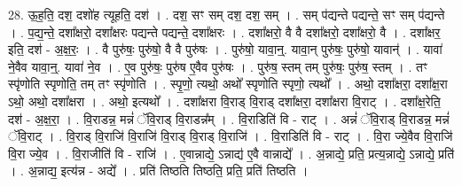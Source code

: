 \documentclass[17pt]{extarticle}
\begin{document}
28. ऊ॒ह॒ति॒ दश॒ दशो॑ह त्यूहति॒ दश॑ । . दश॒ सꣳ सम् दश॒ दश॒ सम् । . सम् प॑द्यन्ते पद्यन्ते॒ सꣳ सम् प॑द्यन्ते । . प॒द्य॒न्ते॒ दशा᳚क्षरो॒ दशा᳚क्षरः पद्यन्ते पद्यन्ते॒ दशा᳚क्षरः । . दशा᳚क्षरो॒ वै वै दशा᳚क्षरो॒ दशा᳚क्षरो॒ वै । . दशा᳚क्षर॒ इति॒ दश॑ - अ॒क्ष॒रः॒ । . वै पुरु॑षः॒ पुरु॑षो॒ वै वै पुरु॑षः । . पुरु॑षो॒ यावा॒न्॒. यावा॒न् पुरु॑षः॒ पुरु॑षो॒ यावान्॑ । . यावा॑ ने॒वैव यावा॒न्॒. यावा॑ ने॒व । . ए॒व पुरु॑षः॒ पुरु॑ष ए॒वैव पुरु॑षः । . पुरु॑ष॒ स्तम् तम् पुरु॑षः॒ पुरु॑ष॒ स्तम् । . तꣳ स्पृ॑णोति स्पृणोति॒ तम् तꣳ स्पृ॑णोति । . स्पृ॒णो॒ त्यथो॒ अथो᳚ स्पृणोति स्पृणो॒ त्यथो᳚ । . अथो॒ दशा᳚क्षरा॒ दशा᳚क्ष॒रा ऽथो॒ अथो॒ दशा᳚क्षरा । . अथो॒ इत्यथो᳚ । . दशा᳚क्षरा वि॒राड् वि॒राड् दशा᳚क्षरा॒ दशा᳚क्षरा वि॒राट् । . दशा᳚क्ष॒रेति॒ दश॑ - अ॒क्ष॒रा॒ । . वि॒राडन्न॒ मन्नं॑ ॅवि॒राड् वि॒राडन्न᳚म् । . वि॒राडिति॑ वि - राट् । . अन्नं॑ ॅवि॒राड् वि॒राडन्न॒ मन्नं॑ ॅवि॒राट् । . वि॒राड् वि॒राजि॑ वि॒राजि॑ वि॒राड् वि॒राड् वि॒राजि॑ । . वि॒राडिति॑ वि - राट् । . वि॒रा ज्ये॒वैव वि॒राजि॑ वि॒रा ज्ये॒व । . वि॒राजीति॑ वि - राजि॑ । . ए॒वान्नाद्ये॒ ऽन्नाद्य॑ ए॒वै वान्नाद्ये᳚ । . अ॒न्नाद्ये॒ प्रति॒ प्रत्य॒न्नाद्ये॒ ऽन्नाद्ये॒ प्रति॑ । . अ॒न्नाद्य॒ इत्य॑न्न - अद्ये᳚ । . प्रति॑ तिष्ठति तिष्ठति॒ प्रति॒ प्रति॑ तिष्ठति । \newline
\end{document}
